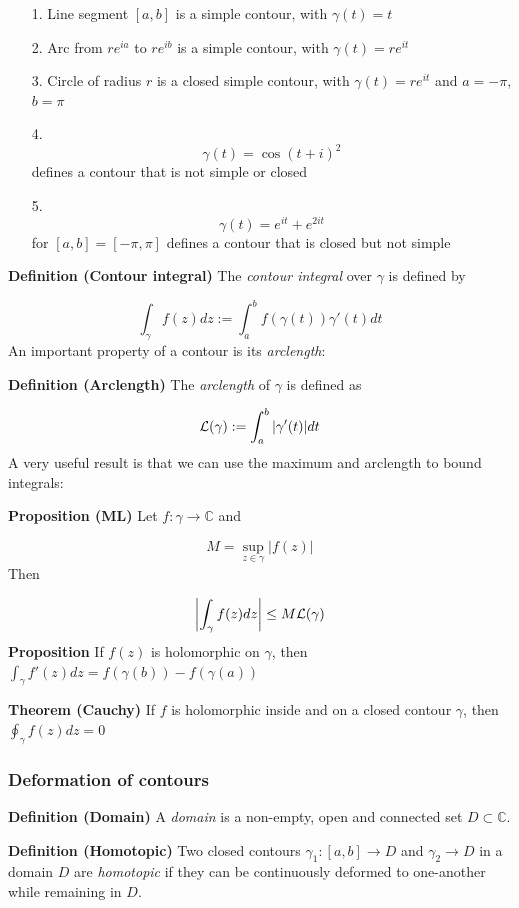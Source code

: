 \documentclass[12pt,a4paper]{article}
\begin{document}
\begin{itemize}
\item[1. ] Line segment $[a,b]$ is a simple contour, with $\gamma(t) =  t$


\item[2. ] Arc from $re^{ia}$ to $re^{ib}$ is a simple contour, with $\gamma(t) =  re^{i t}$


\item[3. ] Circle of radius $r$ is a closed simple contour, with $\gamma(t) = re^{i t}$ and $a = -\pi$, $b = \pi$


\item[4. ] \[
\gamma(t) = \cos (t+i)^2
\]
defines a contour that is not simple or closed


\item[5. ] \[
\gamma(t) = e^{i t} + e^{2i t}
\]
for $[a,b] = [-\pi,\pi]$ defines a contour that is closed but not simple

\end{itemize}
\textbf{Definition (Contour integral)} The \emph{contour integral} over $\gamma$ is defined by

\[
\int_\gamma f(z) dz := \int_a^b f(\gamma(t)) \gamma'(t) dt
\]
An important property of a contour is its \emph{arclength}:

\textbf{Definition (Arclength)} The \emph{arclength} of $\gamma$ is defined as

\[
    {\cal L}(\gamma) := \int_a^b |\gamma'(t)| dt
\]
A very useful result is that we can use the maximum and arclength to bound integrals:

\textbf{Proposition (ML)} Let $f : \gamma \rightarrow {\mathbb C}$ and 

\[
        M = \sup_{z \in \gamma} |f(z)|
\]
Then

\[
\left|\int_\gamma f(z) dz \right| \leq M {\cal L}(\gamma)
\]
\textbf{Proposition} If $f(z)$ is holomorphic on $\gamma$, then $\int_\gamma f'(z) dz = f(\gamma(b)) - f(\gamma(a))$

\textbf{Theorem (Cauchy)} If $f$ is holomorphic inside and on a closed contour $\gamma$, then  $\oint_\gamma f(z) dz = 0$

\subsubsection{Deformation of contours}
\textbf{Definition (Domain)} A \emph{domain} is a non-empty, open and connected set $D \subset {\mathbb C}$.

\textbf{Definition (Homotopic)} Two closed contours $\gamma_1 : [a,b] \rightarrow D$ and $\gamma_2 \rightarrow D$ in a domain $D$ are \emph{homotopic} if they can be continuously deformed to one-another while remaining in $D$. 
\end{document}
